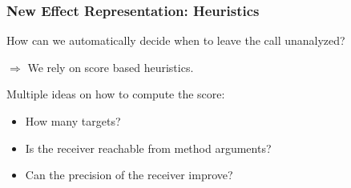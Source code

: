 \documentclass[hyperref={pdfpagelabels=false}]{beamer}
\begin{document}
\begin{frame}[fragile]
\frametitle{New Effect Representation: Heuristics}
    How can we automatically decide when to leave the call unanalyzed?

    \vspace{15pt}
    $\Rightarrow$ We rely on score based heuristics.

    \vspace{15pt}
    Multiple ideas on how to compute the score:
    \begin{itemize}
        \item How many targets?
        \item Is the receiver reachable from method arguments?
        \item Can the precision of the receiver improve?
    \end{itemize}
\end{frame}
\end{document}

